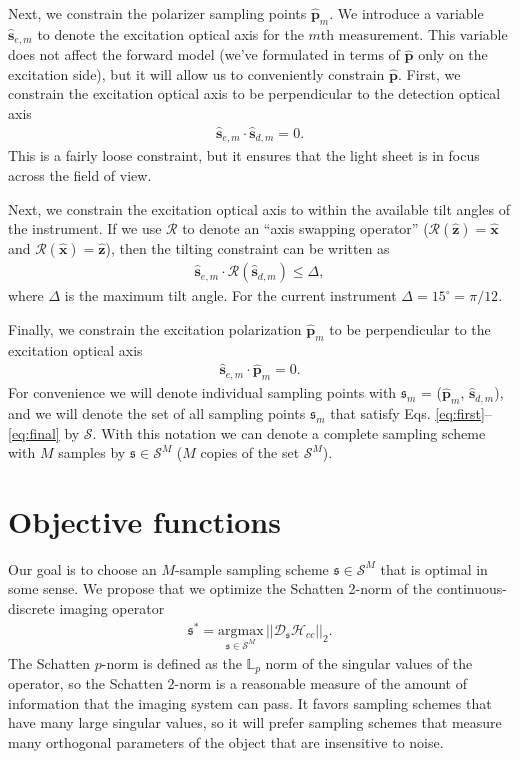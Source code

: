 \documentclass[11pt]{article}
\providecommand{\argmax}[1]{\underset{#1}{\mathrm{argmax}}\,}
\providecommand{\mc}[1]{\mathcal{#1}}
\providecommand{\pp}{\mathbf{\hat{p}}}
\providecommand{\mh}[1]{\mathbf{\hat{#1}}}
\providecommand{\mf}[1]{\mathfrak{#1}}
\providecommand{\mbb}[1]{\mathbb{#1}}
\begin{document}
Next, we constrain the polarizer sampling points $\mh{p}_m$. We introduce a
variable $\mh{s}_{e,m}$ to denote the excitation optical axis for the $m$th
measurement. This variable does not affect the forward model (we've formulated
in terms of $\pp$ only on the excitation side), but it will allow us to
conveniently constrain $\pp$. First, we constrain the excitation optical axis to
be perpendicular to the detection optical axis
\begin{align}
  \mh{s}_{e,m} \cdot \mh{s}_{d,m} = 0.
\end{align}
This is a fairly loose constraint, but it ensures that the light sheet is in
focus across the field of view.

Next, we constrain the excitation optical axis to within the available tilt
angles of the instrument. If we use $\mc{R}$ to denote an ``axis swapping
operator'' ($\mc{R}(\mh{z}) = \mh{x}$ and $\mc{R}(\mh{x}) = \mh{z}$), then the tilting
constraint can be written as
\begin{align}
  \mh{s}_{e,m} \cdot \mc{R}(\mh{s}_{d,m}) \leq \Delta,
\end{align}
where $\Delta$ is the maximum tilt angle. For the current instrument $\Delta = 15^{\circ} = \pi/12$.

Finally, we constrain the excitation polarization $\pp_m$ to be perpendicular to
the excitation optical axis
\begin{align}
  \mh{s}_{e,m} \cdot \pp_m = 0.  \label{eq:final}
\end{align}
For convenience we will denote individual sampling points with $\mf{s}_m$ =
($\pp_m$, $\mh{s}_{d,m}$), and we will denote the set of all sampling points
$\mf{s}_m$ that satisfy Eqs. \eqref{eq:first}--\eqref{eq:final} by $\mc{S}$.
With this notation we can denote a complete sampling scheme with $M$ samples
by $\mf{s} \in \mc{S}^M$ ($M$ copies of the set $\mc{S}^M$).

\section{Objective functions}
Our goal is to choose an $M$-sample sampling scheme $\mf{s} \in \mc{S}^M$ that
is optimal in some sense. We propose that we optimize the Schatten 2-norm of the
continuous-discrete imaging operator
\begin{align}
  \mf{s}^* = \argmax{\mf{s} \in \mc{S}^M}||\mc{D}_{\mf{s}}\mc{H}_{cc}||_2. \label{eq:notime}
\end{align}
The Schatten $p$-norm is defined as the $\mbb{L}_p$ norm of the singular values
of the operator, so the Schatten $2$-norm is a reasonable measure of the amount
of information that the imaging system can pass. It favors sampling schemes that
have many large singular values, so it will prefer sampling schemes that measure
many orthogonal parameters of the object that are insensitive to noise.
\end{document}
